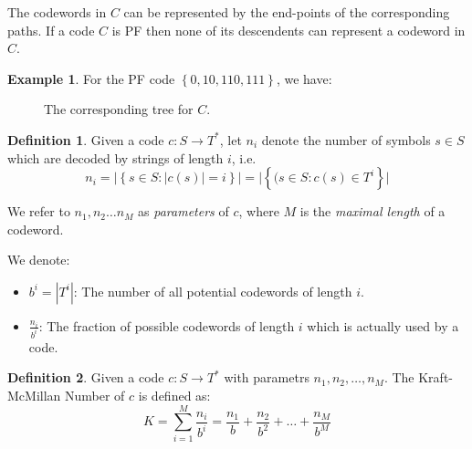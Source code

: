 \documentclass[a4paper]{article}
\theoremstyle{definition} \newtheorem*{definition}{Definition}
\newtheorem*{exmp}{Example} \newtheorem*{exmps}{Examples}
\begin{document}
\begin{remark}
  The codewords in $C$ can be represented by the end-points of the 
  corresponding paths. If a code $C$ is PF then none of its descendents
  can represent a codeword in $C$.
\end{remark}

\begin{exmp}
  For the PF code $\left\{ 0,10,110,111 \right\}$, we have:
  \begin{figure}[!h]
    \centering
    \caption{The corresponding tree for $C$.}
    \label{fig:treepf}
  \end{figure}
\end{exmp}

\begin{definition}
  Given a code $c : S \rightarrow T^*$, let $n_i$ denote the number of
  symbols $s \in S$ which are decoded by strings of length $i$, i.e.
  \[
    n_i = \Big| \left\{ s \in S : |c(s)| = i \right\} \Big| = 
  \Big| \left\{( s \in S : c(s) \in T^i \right\} \Big|
  \]

  We refer to $n_1,n_2\dots n_M$ as \emph{parameters} of $c$, where
  $M$ is the \emph{maximal length} of a codeword.
\end{definition}

\begin{remark}
  We denote:
\begin{itemize}
  \item $b^i=|T^i|$: The number of all potential codewords of length $i$.
  \item $\frac{n_i}{b^i}$: The fraction of possible codewords of length
    $i$ which is actually used by a code.
\end{itemize}
\end{remark}

\begin{definition}
  Given a code $c:S \rightarrow T^*$ with parametrs $n_1,n_2,\dots, n_M$. 
  The Kraft-McMillan Number of $c$ is defined as:
  \[
    K = \sum_{i=1}^M \frac{n_i}{b^i} = \frac{n_1}{b} + \frac{n_2}{b^2} +
    \dots + \frac{n_M}{b^M}
  \]
\end{definition}
\end{document}
